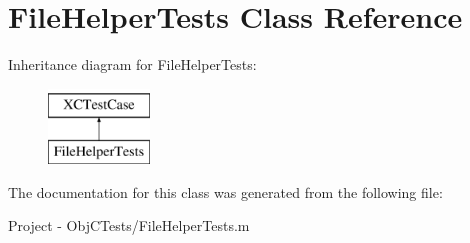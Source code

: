 \hypertarget{interface_file_helper_tests}{}\section{File\+Helper\+Tests Class Reference}
\label{interface_file_helper_tests}
Inheritance diagram for File\+Helper\+Tests\+:\begin{figure}[H]
\begin{center}
\leavevmode
\includegraphics[height=2.000000cm]{interface_file_helper_tests}
\end{center}
\end{figure}


The documentation for this class was generated from the following file\+:\begin{DoxyCompactItemize}
\item 
Project -\/ Obj\+C\+Tests/File\+Helper\+Tests.\+m\end{DoxyCompactItemize}
